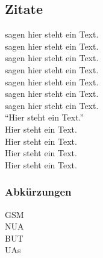 \subsection{Zitate}
\cite{Google13} sagen hier steht ein Text. \\
\citet{Hidayat13} sagen hier steht ein Text. \\
\citet*{Yahoo13} sagen hier steht ein Text. \\
\citet*{Trostler13} sagen hier steht ein Text. \\
\citet*{Wiki13-01} sagen hier steht ein Text. \\
\citet*{Wiki13-02} sagen hier steht ein Text. \\
\citet*{Wiki13-03} sagen hier steht ein Text. \\
"`Hier steht ein Text."' \citep{Johansen10} \\
Hier steht ein Text. \citep[Vgl.][]{Kleivane11} \\
Hier steht ein Text. \citep[][S. 200]{Koch01} \\
Hier steht ein Text. \citep*[][S. 200]{Pivotal13} \\
Hier steht ein Text. \citep{Selenium13,Nguyen13} \\


\subsubsection{Abkürzungen}
\acf{GSM} \\
\acs{NUA} \\
\acl{BUT}  \\
\acp{UA} \\


